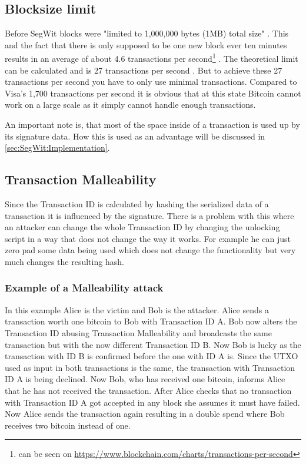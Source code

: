 \subsection{Blocksize limit}
\label{sec:Basics:BlocksizeLimit}
Before SegWit blocks were "limited to 1,000,000 bytes (1MB) total size" \cite{bip-141}. This and the fact that there is only supposed to be one new block ever ten minutes \cite{nakamoto} results in an average of about 4.6 transactions per second\footnote{can be seen on \url{https://www.blockchain.com/charts/transactions-per-second}} \cite{hackernoon}.
The theoretical limit can be calculated and is 27 transactions per second \cite{transaction_limit}. But to achieve these 27 transactions per second you have to only use minimal transactions.
Compared to Visa's 1,700 transactions per second \cite{hackernoon} it is obvious that at this state Bitcoin cannot work on a large scale as it simply cannot handle enough transactions.

An important note is, that most of the space inside of a transaction is used up by its signature data. How this is used as an advantage will be discussed in \autoref{sec:SegWit:Implementation}.



\subsection{Transaction Malleability}
\label{sec:Basics:TransactionMalleability}
Since the Transaction ID is calculated by hashing the serialized data of a transaction it is influenced by the signature. There is a problem with this where an attacker can change the whole Transaction ID by changing the unlocking script in a way that does not change the way it works. For example he can just zero pad some data being used which does not change the functionality but very much changes the resulting hash.

\subsubsection{Example of a Malleability attack}
\label{subsec:Basics:TransactionMalleability:Attack}
In this example Alice is the victim and Bob is the attacker.
Alice sends a transaction worth one bitcoin to Bob with Transaction ID A.
Bob now alters the Transaction ID abusing Transaction Malleability and broadcasts the same transaction but with the now different Transaction ID B.
Now Bob is lucky as the transaction with ID B is confirmed before the one with ID A is. Since the UTXO used as input in both transactions is the same, the transaction with Transaction ID A is being declined.
Now Bob, who has received one bitcoin, informs Alice that he has not received the transaction. After Alice checks that no transaction with Transaction ID A got accepted in any block she assumes it must have failed.
Now Alice sends the transaction again resulting in a double spend where Bob receives two bitcoin instead of one.

